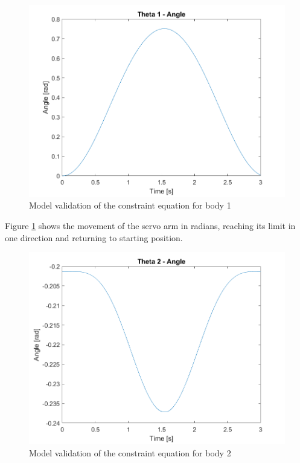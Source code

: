\begin{figure}[H]
  \centering
  \includegraphics[scale=0.8]{graphics/Integration/theta1.png}
  \caption{Model validation of the constraint equation for body 1}
  \label{fig:Model validation of the constraint equation for body 1}
\end{figure}

Figure \ref{fig:Model validation of the constraint equation for body 1} shows the movement of the servo arm in radians, reaching its limit in one direction and returning to starting position.   

\begin{figure}[H]
  \centering
  \includegraphics[scale=0.8]{graphics/Integration/theta2.png}
  \caption{Model validation of the constraint equation for body 2}
  \label{fig:Model validation of the constraint equation for body 2}
\end{figure}

